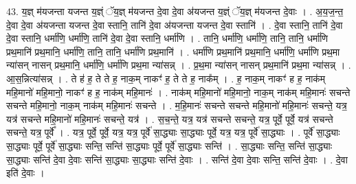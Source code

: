 \documentclass[17pt]{extarticle}
\begin{document}
43. य॒ज्ञ् म॑यजन्ता यजन्त य॒ज्ञ्ं ॅय॒ज्ञ् म॑यजन्त दे॒वा दे॒वा अ॑यजन्त य॒ज्ञ्ं ॅय॒ज्ञ् म॑यजन्त दे॒वाः । . अ॒य॒ज॒न्त॒ दे॒वा दे॒वा अ॑यजन्ता यजन्त दे॒वा स्तानि॒ तानि॑ दे॒वा अ॑यजन्ता यजन्त दे॒वा स्तानि॑ । . दे॒वा स्तानि॒ तानि॑ दे॒वा दे॒वा स्तानि॒ धर्मा॑णि॒ धर्मा॑णि॒ तानि॑ दे॒वा दे॒वा स्तानि॒ धर्मा॑णि । . तानि॒ धर्मा॑णि॒ धर्मा॑णि॒ तानि॒ तानि॒ धर्मा॑णि प्रथ॒मानि॑ प्रथ॒मानि॒ धर्मा॑णि॒ तानि॒ तानि॒ धर्मा॑णि प्रथ॒मानि॑ । . धर्मा॑णि प्रथ॒मानि॑ प्रथ॒मानि॒ धर्मा॑णि॒ धर्मा॑णि प्रथ॒मा न्या॑सन् नासन् प्रथ॒मानि॒ धर्मा॑णि॒ धर्मा॑णि प्रथ॒मा न्या॑सन्न् । . प्र॒थ॒मा न्या॑सन् नासन् प्रथ॒मानि॑ प्रथ॒मा न्या॑सन्न् । . आ॒स॒न्नित्या॑सन्न् । . ते ह॑ ह॒ ते ते ह॒ नाक॒म् नाकꣳ॑ ह॒ ते ते ह॒ नाक᳚म् । . ह॒ नाक॒म् नाकꣳ॑ ह ह॒ नाक॑म् महि॒मानो॑ महि॒मानो॒ नाकꣳ॑ ह ह॒ नाक॑म् महि॒मानः॑ । . नाक॑म् महि॒मानो॑ महि॒मानो॒ नाक॒म् नाक॑म् महि॒मानः॑ सचन्ते सचन्ते महि॒मानो॒ नाक॒म् नाक॑म् महि॒मानः॑ सचन्ते । . म॒हि॒मानः॑ सचन्ते सचन्ते महि॒मानो॑ महि॒मानः॑ सचन्ते॒ यत्र॒ यत्र॑ सचन्ते महि॒मानो॑ महि॒मानः॑ सचन्ते॒ यत्र॑ । . स॒च॒न्ते॒ यत्र॒ यत्र॑ सचन्ते सचन्ते॒ यत्र॒ पूर्वे॒ पूर्वे॒ यत्र॑ सचन्ते सचन्ते॒ यत्र॒ पूर्वे᳚ । . यत्र॒ पूर्वे॒ पूर्वे॒ यत्र॒ यत्र॒ पूर्वे॑ सा॒द्ध्याः सा॒द्ध्याः पूर्वे॒ यत्र॒ यत्र॒ पूर्वे॑ सा॒द्ध्याः । . पूर्वे॑ सा॒द्ध्याः सा॒द्ध्याः पूर्वे॒ पूर्वे॑ सा॒द्ध्याः सन्ति॒ सन्ति॑ सा॒द्ध्याः पूर्वे॒ पूर्वे॑ सा॒द्ध्याः सन्ति॑ । . सा॒द्ध्याः सन्ति॒ सन्ति॑ सा॒द्ध्याः सा॒द्ध्याः सन्ति॑ दे॒वा दे॒वाः सन्ति॑ सा॒द्ध्याः सा॒द्ध्याः सन्ति॑ दे॒वाः । . सन्ति॑ दे॒वा दे॒वाः सन्ति॒ सन्ति॑ दे॒वाः । . दे॒वा इति॑ दे॒वाः । \newline
\pagebreak
\end{document}
